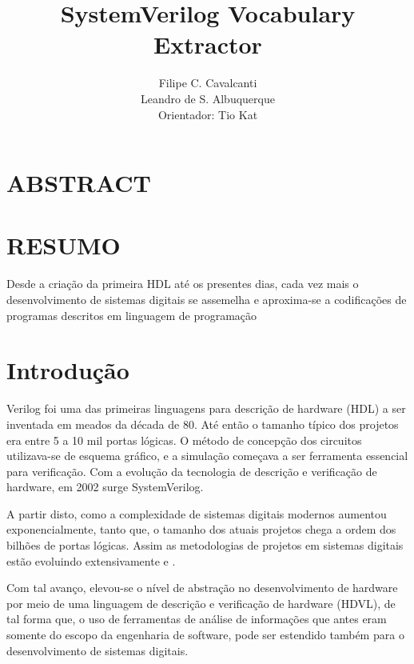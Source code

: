 \documentclass[12pt, twocolumn, a4paper]{article}
\begin{document}
	\title{SystemVerilog Vocabulary Extractor}
	\author{Filipe C. Cavalcanti\\ Leandro de S. Albuquerque\\
	Orientador: Tio Kat}
	\maketitle
	
	\section{ABSTRACT}
	
	\section{RESUMO}
	\quad Desde a criação da primeira HDL até os presentes dias, cada vez mais o desenvolvimento de sistemas digitais se assemelha e aproxima-se a codificações de programas descritos em linguagem de programação  
	
	\section{Introdução}

\quad Verilog foi uma das primeiras linguagens para descrição de hardware (HDL) a ser inventada em meados da década de 80. Até então o tamanho típico dos projetos era entre 5 a 10 mil portas lógicas. O método de concepção dos circuitos utilizava-se de esquema gráfico, e a simulação começava a ser  ferramenta essencial para verificação\cite{sutherland2006}. Com a evolução da tecnologia de descrição e verificação de hardware, em 2002 surge SystemVerilog. 

A partir disto, como a complexidade de sistemas digitais modernos aumentou exponencialmente, tanto que, o tamanho dos atuais projetos chega a ordem dos bilhões de portas lógicas. Assim as metodologias de projetos em sistemas digitais estão evoluindo extensivamente \cite{Marc-Andre} e \cite{Hahanov2008}.

Com tal avanço, elevou-se o nível de abstração no desenvolvimento de hardware por meio de uma linguagem de descrição e verificação de hardware (HDVL), de tal forma que, o uso de ferramentas de análise de informações que antes eram somente do escopo da engenharia de software, pode ser estendido também para o desenvolvimento de sistemas digitais.
\end{document}
